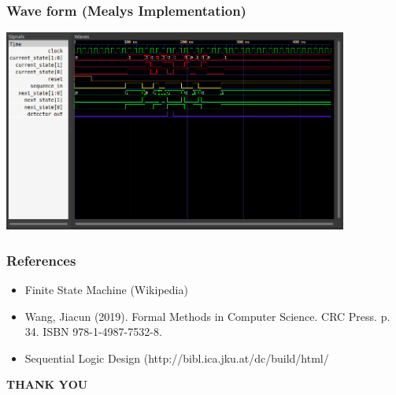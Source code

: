 \documentclass[xcolor=table]{beamer}
\begin{document}
\begin{frame}
  \frametitle{Wave form (Mealys Implementation)}
  \centering
  \includegraphics[width=0.85\textwidth, height=0.65\textheight]{./static/res_wave_mealy.png}
\end{frame}

\begin{frame}
  \frametitle{References}
 \begin{itemize}
      \item{Finite State Machine (Wikipedia)}
      \item{Wang, Jiacun (2019). Formal Methods in Computer Science. CRC Press. p. 34. ISBN 978-1-4987-7532-8.
      }
      \item{Sequential Logic Design (http://bibl.ica.jku.at/dc/build/html/}
      
  \end{itemize} 
  
\end{frame}

\begin{frame}
  \textbf{THANK YOU}
\end{frame}
\end{document}
